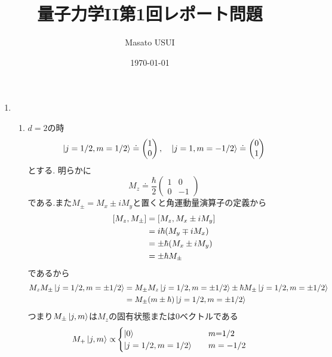 \documentclass[uplatex,dvipdfmx, a4paper,11pt]{jsarticle}
\begin{document}
\title{量子力学II第1回レポート問題}
\author{Masato USUI}
\date{\today}
\maketitle
\begin{enumerate}[1.]
    \item \begin{enumerate}[1）]
        \item $d=2$の時\\
    \begin{equation}
        \ket{j=1/2,m=1/2}\doteq \begin{pmatrix}
            1\\0
        \end{pmatrix}
        ,\quad \ket{j=1, m=-1/2}\doteq \begin{pmatrix}
            0\\1
        \end{pmatrix}
    \end{equation}
    とする.
        明らかに
    \begin{equation}
        M_z\doteq \frac{\hbar}{2}\begin{pmatrix}
            1&0\\
            0&-1
        \end{pmatrix}
    \end{equation}
    である.また$M_{\pm}=M_x\pm iM_y$と置くと角運動量演算子の定義から
    \begin{align*}
        \qty[M_z, M_{\pm}]&=\qty[M_z,M_x\pm iM_y]\\
        &=i\hbar\qty(M_y\mp iM_x)\\
        &=\pm\hbar\qty(M_x\pm iM_y)\\
        &=\pm\hbar M_{\pm}
    \end{align*}
    であるから
    \begin{align*}
        M_zM_{\pm}\ket{j=1/2,m=\pm 1/2}&=M_{\pm}M_z\ket{j=1/2,m=\pm 1/2}\pm \hbar M_{\pm}\ket{j=1/2,m=\pm 1/2}\\
        &=M_{\pm}\qty(m\pm \hbar)\ket{j=1/2, m=\pm 1/2}
    \end{align*}
    つまり$M_{\pm}\ket{j,m}$は$M_z$の固有状態または0ベクトルである
    \begin{align*}
        M_{+}\ket{j,m}\propto  &\begin{cases}
            \ket{0}&\qq{$m$=1/2}\\
            \ket{j=1/2,m=1/2} &\qq{$m=-1/2$}
        \end{cases}\\

\end{align*}
\end{enumerate}
\end{enumerate}
\end{document}
